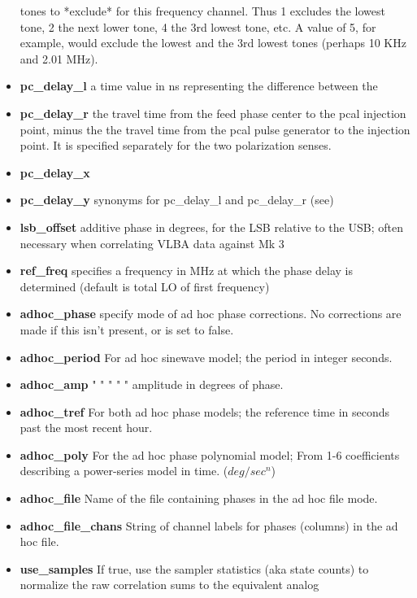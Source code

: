 \begin{itemize}
             tones to *exclude* for this frequency channel. Thus 1 
             excludes the lowest tone, 2 the next lower tone, 4 the 3rd 
             lowest tone, etc. A value of 5, for example, would exclude 
             the lowest and the 3rd lowest tones (perhaps 10 KHz and 2.01
             MHz).  
\item[]\textbf{pc\_delay\_l} a time value in ns representing the difference between the
\item[]\textbf{pc\_delay\_r} the travel time from the feed phase center to the pcal
             injection point, minus the the travel time from the pcal
             pulse generator to the injection point. It is specified
             separately for the two polarization senses.
\item[]\textbf{pc\_delay\_x} 
\item[]\textbf{pc\_delay\_y} synonyms for pc\_delay\_l and pc\_delay\_r (see)
\item[]\textbf{lsb\_offset} additive phase in degrees, for the LSB relative to the USB;
             often necessary when correlating VLBA data against Mk 3
\item[]\textbf{ref\_freq}  specifies a frequency in MHz at which the phase delay
             is determined (default is total LO of first frequency)
\item[]\textbf{adhoc\_phase} specify mode of ad hoc phase corrections. No corrections
             are made if this isn't present, or is set to false.
\item[]\textbf{adhoc\_period}  For ad hoc sinewave model; the period in integer seconds.
\item[]\textbf{adhoc\_amp}      "   "  "     "       "    amplitude in degrees of phase.
\item[]\textbf{adhoc\_tref}    For both ad hoc phase models; the reference time in seconds
             past the most recent hour.
\item[]\textbf{adhoc\_poly} For the ad hoc phase polynomial model; From 1-6 coefficients
             describing a power-series model in time. ($deg/sec^n$)
\item[]\textbf{adhoc\_file} Name of the file containing phases in the ad hoc file mode.
\item[]\textbf{adhoc\_file\_chans} String of channel labels for phases (columns) in the
             ad hoc file.
\item[]\textbf{use\_samples}   If true, use the sampler statistics (aka state counts) to
             normalize the raw correlation sums to the equivalent analog

\end{itemize}
